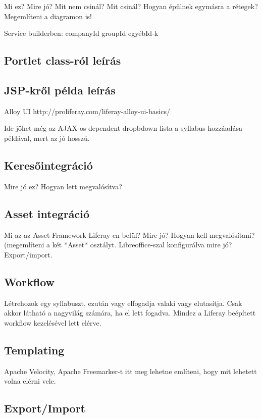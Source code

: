 \documentclass[hidelinks, 12pt, a4paper]{report}
\begin{document}
Mi ez? Mire jó? Mit nem csinál? Mit csinál?
Hogyan épülnek egymásra a rétegek? Megemlíteni a diagramon is!

Service builderben:
companyId
groupId
egyébId-k

\subsection{Portlet class-ról leírás}

\subsection{JSP-kről példa leírás}

Alloy UI http://proliferay.com/liferay-alloy-ui-basics/

Ide jöhet még az AJAX-os dependent dropbdown lista a syllabus hozzáadása példával, mert az jó hosszú.

\subsection{Keresőintegráció}

Mire jó ez? Hogyan lett megvalósítva?

\subsection{Asset integráció}

Mi az az Asset Framework Liferay-en belül? Mire jó? Hogyan kell megvalósítani? (megemlíteni a két *Asset* osztályt.
Libreoffice-szal konfigurálva mire jó? Export/import.

\subsection{Workflow}

Létrehozok egy syllabuszt, ezután vagy elfogadja valaki vagy elutasítja. Csak akkor látható a nagyvilág számára, ha el lett fogadva. Mindez a Liferay beépített workflow kezelésével lett elérve.

\subsection{Templating}

Apache Velocity, Apache Freemarker-t itt meg lehetne említeni, hogy mit lehetett volna elérni vele.

\subsection{Export/Import}
\end{document}
